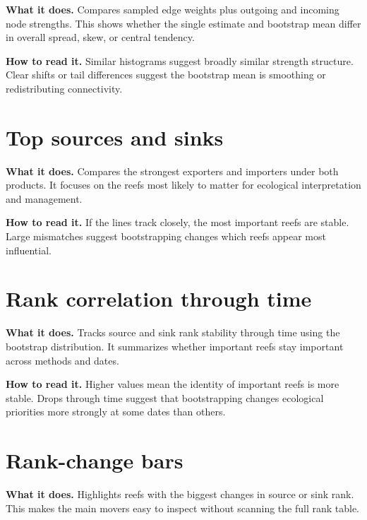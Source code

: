 \documentclass[11pt,a4paper]{article}
\begin{document}
\textbf{What it does.} Compares sampled edge weights plus outgoing and incoming node strengths.
This shows whether the single estimate and bootstrap mean differ in overall spread, skew, or central tendency.


\textbf{How to read it.} Similar histograms suggest broadly similar strength structure.
Clear shifts or tail differences suggest the bootstrap mean is smoothing or redistributing connectivity.

\section{Top sources and sinks}

\textbf{What it does.} Compares the strongest exporters and importers under both products.
It focuses on the reefs most likely to matter for ecological interpretation and management.


\textbf{How to read it.} If the lines track closely, the most important reefs are stable.
Large mismatches suggest bootstrapping changes which reefs appear most influential.

\section{Rank correlation through time}

\textbf{What it does.} Tracks source and sink rank stability through time using the bootstrap distribution.
It summarizes whether important reefs stay important across methods and dates.


\textbf{How to read it.} Higher values mean the identity of important reefs is more stable.
Drops through time suggest that bootstrapping changes ecological priorities more strongly at some dates than others.

\section{Rank-change bars}

\textbf{What it does.} Highlights reefs with the biggest changes in source or sink rank.
This makes the main movers easy to inspect without scanning the full rank table.
\end{document}

